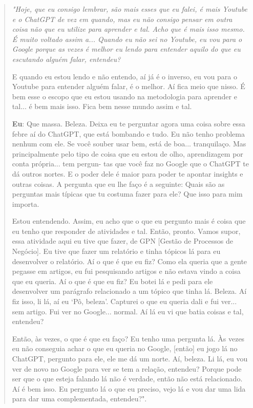 \begin{quote}
    \itshape
    "Hoje, que eu consigo lembrar, são mais esses que eu falei, é mais Youtube e o ChatGPT de vez em quando, mas eu não consigo pensar em outra coisa não que eu utilize para aprender e tal. Acho que é mais isso mesmo. É muito voltado assim a... Quando eu não sei no Youtube, eu vou para o Google porque as vezes é melhor eu lendo para entender aquilo do que eu escutando alguém falar, entendeu?

    E quando eu estou lendo e não entendo, aí já é o inverso, eu vou para o Youtube para entender alguém falar, é o melhor. Aí fica meio que nisso. É bem esse o escopo que eu estou usando na metodologia para aprender e tal... é bem mais isso. Fica bem nesse mundo assim e tal.
    
    \colorbox{black!15}{\textbf{Eu}: Que massa. Beleza. Deixa eu te perguntar agora uma coisa sobre essa febre}
    \colorbox{black!15}{aí do ChatGPT, que está bombando e tudo. Eu não tenho problema nenhum com} \colorbox{black!15}{ele. Se você souber usar bem, está de boa... tranquilaço. Mas principalmente pelo} \colorbox{black!15}{tipo de coisa que eu estou de olho, aprendizagem por conta própria... tem pergun-} \colorbox{black!15}{tas que você faz no Google que o ChatGPT te dá outros nortes. E o poder dele é} \colorbox{black!15}{maior para poder te apontar insights e outras coisas. A pergunta que eu lhe faço} \colorbox{black!15}{é a seguinte: Quais são as perguntas mais típicas que tu costuma fazer para ele?} \colorbox{black!15}{Que isso para mim importa.}
    

    Estou entendendo. Assim, eu acho que o que eu pergunto mais é coisa que eu tenho que responder de atividades e tal. Então, pronto. Vamos supor, essa atividade aqui eu tive que fazer, de GPN [Gestão de Processos de Negócio]. Eu tive que fazer um relatório e tinha tópicos lá para eu desenvolver o relatório. Aí o que é que eu fiz? Como ela queria que a gente pegasse em artigos, eu fui pesquisando artigos e não estava vindo a coisa que eu queria. Aí o que é que eu fiz? Eu botei lá e pedi para ele desenvolver um parágrafo relacionado a um tópico que tinha lá. Beleza. Aí fiz isso, li lá, aí eu `Pô, beleza'. Capturei o que eu queria dali e fui ver... sem artigo. Fui ver no Google... normal. Aí lá eu vi que batia coisas e tal, entendeu? 
    
    Então, às vezes, o que é que eu faço? Eu tenho uma pergunta lá. Às vezes eu não conseguia achar o que eu queria no Google, [então] eu jogo lá no ChatGPT, pergunto para ele, ele me dá um norte. Aí, beleza. Li lá, eu vou ver de novo no Google para ver se tem a relação, entendeu? Porque pode ser que o que esteja falando lá não é verdade, então não está relacionado. Aí é bem isso. Eu pergunto lá o que eu preciso, vejo lá e vou dar uma lida para dar uma complementada, entendeu?".
\end{quote}

